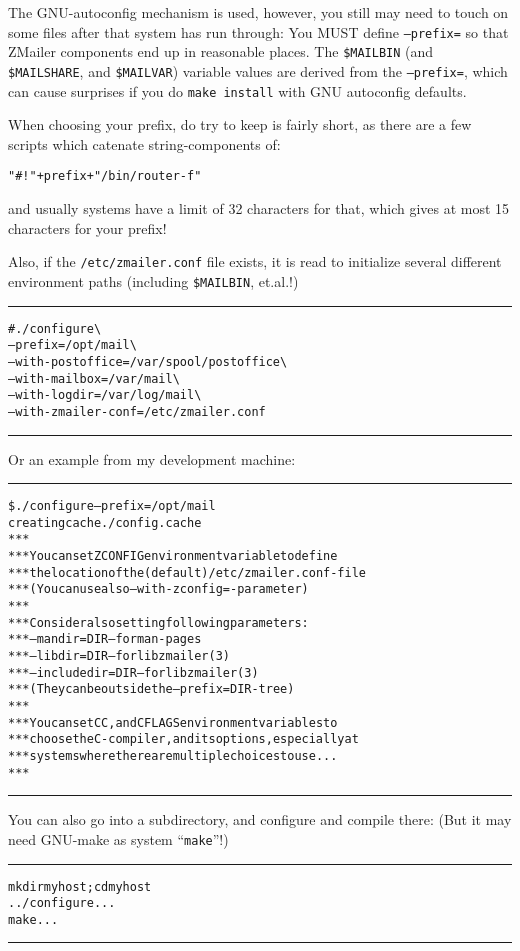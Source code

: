 The GNU-autoconfig mechanism is used, however, you still may need to
touch on some files after that system has run through:
You MUST define {\tt --prefix=} so that ZMailer components end up
in reasonable places.  The {\tt \$MAILBIN} (and {\tt \$MAILSHARE},
and {\tt \$MAILVAR}) variable values are derived from
the {\tt --prefix=}, which can cause surprises if you do
{\tt make install} with GNU autoconfig defaults.

When choosing your prefix, do try to keep is fairly short, as
there are a few scripts which catenate string-components of:%
\medskip\begin{alltt}
  "#! "+prefix+"/bin/router -f"
\end{alltt}\medskip%
and usually systems have a limit of 32 characters for that,
which gives at most 15 characters for your prefix!

Also, if the {\tt /etc/zmailer.conf} file exists, it is read
to initialize several different environment paths (including
{\tt \$MAILBIN}, et.al.!)

\begin{alltt}\hrule\medskip
# ./configure                             \verb/\/
  --prefix=/opt/mail                      \verb/\/
  --with-postoffice=/var/spool/postoffice \verb/\/
  --with-mailbox=/var/mail                \verb/\/
  --with-logdir=/var/log/mail             \verb/\/
  --with-zmailer-conf=/etc/zmailer.conf
\medskip\hrule\end{alltt}

Or an example from my development machine:\medskip
\nopagebreak
\begin{alltt}\hrule\medskip
\$ ./configure --prefix=/opt/mail
creating cache ./config.cache
***
*** You can set  ZCONFIG  environment variable to define
*** the location of the (default) /etc/zmailer.conf -file
*** (You can use also   --with-zconfig=  -parameter)
***
*** Consider also setting following parameters:
***   --mandir=DIR     -- for man-pages
***   --libdir=DIR     -- for libzmailer(3)
***   --includedir=DIR -- for libzmailer(3)
*** (They can be outside the --prefix=DIR -tree)
***
*** You can set CC, and CFLAGS  environment variables to
*** choose the C-compiler, and its options, especially at
*** systems where there are multiple choices to use...
***
\medskip\hrule\end{alltt}\medskip

You can also go into a subdirectory, and configure and
compile there: (But it may need GNU-make as system ``{\tt make}''!)
\nopagebreak%
\begin{alltt}\medskip\hrule\medskip
  mkdir myhost ; cd myhost
  ../configure ...
  make ...
\medskip\hrule\end{alltt}\medskip


